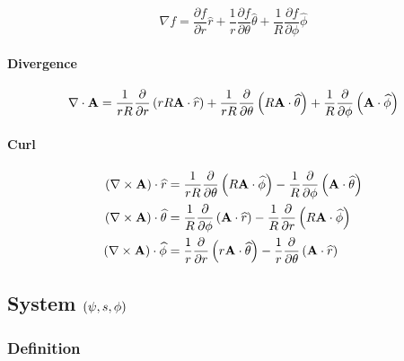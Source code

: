 \begin{equation}
\nabla f=\frac{\partial f}{\partial r}\widehat{r}+\frac{1}{r}\frac{\partial f%
}{\partial\theta}\widehat{\theta}+\frac{1}{R}\frac{\partial f}{\partial\phi }%
\widehat{\phi}
\end{equation}

\paragraph{Divergence}

\begin{equation}
\nabla\cdot\mathbf{A}=\frac{1}{rR}\frac{\partial}{\partial r}\left( rR%
\mathbf{A} \cdot\widehat{r}\right) +\frac{1}{rR}\frac{\partial}{%
\partial\theta} \left( R\mathbf{A}\cdot\widehat{\theta}\right) +\frac{1}{R}%
\frac{\partial}{ \partial\phi}\left( \mathbf{A}\cdot\widehat{\phi}\right)
\end{equation}

\paragraph{Curl}

\begin{align}
\left( \nabla\times\mathbf{A}\right) \cdot\widehat{r} & =\frac{1}{rR}\frac{
\partial}{\partial\theta}\left( R\mathbf{A}\cdot\widehat{\phi}\right) -\frac{%
1}{R}\frac{\partial}{\partial\phi}\left( \mathbf{A}\cdot\widehat{ \theta}%
\right) \\
\left( \nabla\times\mathbf{A}\right) \cdot\widehat{\theta} & =\frac{1}{R}%
\frac{\partial}{\partial\phi}\left( \mathbf{A}\cdot\widehat{r}\right) -\frac{%
1}{R}\frac{\partial}{\partial r}\left( R\mathbf{A}\cdot\widehat{\phi} \right)
\\
\left( \nabla\times\mathbf{A}\right) \cdot\widehat{\phi} & =\frac{1}{r}\frac{%
\partial}{\partial r}\left( r\mathbf{A}\cdot\widehat{\theta}\right) -\frac{1%
}{r}\frac{\partial}{\partial\theta}\left( \mathbf{A}\cdot\widehat{r} \right)
\end{align}

\subsection{System $\left( \protect\psi,s,\protect\phi\right) $}

\subsubsection{Definition}

